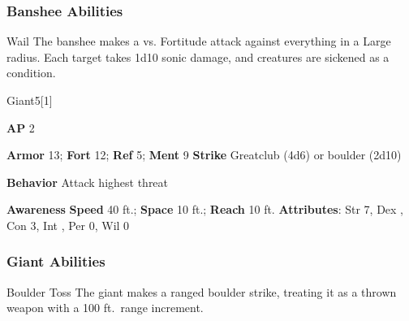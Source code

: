 \subsubsection{Banshee Abilities}

\begin{ability}{Wail}
The banshee makes a  vs. Fortitude attack against everything in a Large radius.
\hit Each target takes 1d10 sonic damage, and creatures are sickened as a condition.
\end{ability}






\begin{monsection}[Hill]{Giant}{5}[1]
\vspace{-1em}\vspace{-1em}
\begin{spellcontent}
\begin{spelltargetinginfo}
{\textbf{AP} 2}

\pari \textbf{Armor} 13;
\textbf{Fort} 12;
\textbf{Ref} 5;
\textbf{Ment} 9
\pari \textbf{Strike} Greatclub  (4d6) or boulder  (2d10)



\pari \textbf{Behavior} Attack highest threat
\end{spelltargetinginfo}
\end{spellcontent}

\begin{monsterfooter}
\pari \textbf{Awareness} 
\pari \textbf{Speed} 40 ft.;
\textbf{Space} 10 ft.;
\textbf{Reach} 10 ft.
\pari \textbf{Attributes}:
Str 7,
Dex ,
Con 3,
Int ,
Per 0,
Wil 0
\end{monsterfooter}
\end{monsection}


\subsubsection{Giant Abilities}

\begin{ability}{Boulder Toss}
The giant makes a ranged boulder strike, treating it as a thrown weapon with a 100 ft.\ range increment.
\end{ability}







